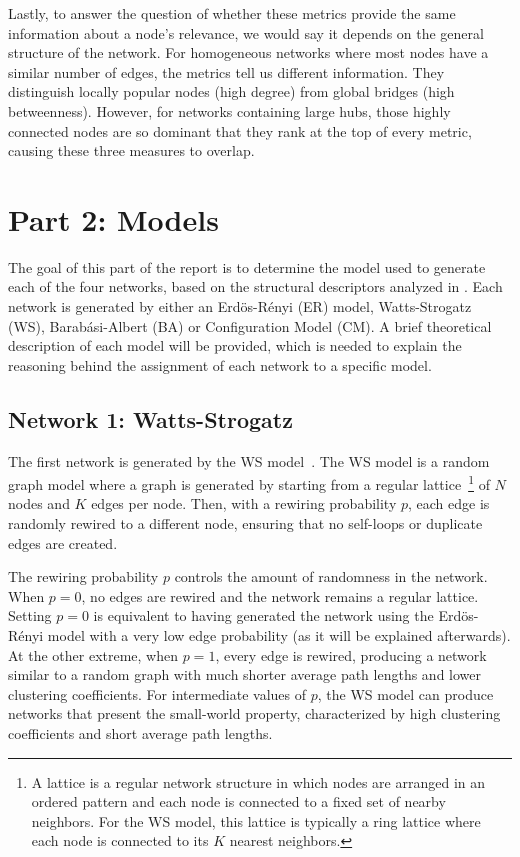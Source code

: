 \documentclass{article}
\begin{document}
Lastly, to answer the question of whether these metrics provide the same information about a node's relevance, we would say it depends on the general structure of the network. For homogeneous networks where most nodes have a similar number of edges, the metrics tell us different information. They distinguish locally popular nodes (high degree) from global bridges (high betweenness). However, for networks containing large hubs, those highly connected nodes are so dominant that they rank at the top of every metric, causing these three measures to overlap.

\section{Part 2: Models}

The goal of this part of the report is to determine the model used to generate each of the four networks, based on the structural descriptors analyzed in . Each network is generated by either an Erdös-Rényi (ER) model, Watts-Strogatz (WS), Barabási-Albert (BA) or Configuration Model (CM). A brief theoretical description of each model will be provided, which is needed to explain the reasoning behind the assignment of each network to a specific model.

\subsection{Network 1: Watts-Strogatz} %

The first network is generated by the WS model~\cite{watts1998collective}. The WS model is a random graph model where a graph is generated by starting from a regular lattice~\footnote{A lattice is a regular network structure in which nodes are arranged in an ordered pattern and each node is connected to a fixed set of nearby neighbors. For the WS model, this lattice is typically a ring lattice where each node is connected to its $K$ nearest neighbors.} of $N$ nodes and $K$ edges per node. Then, with a rewiring probability $p$, each edge is randomly rewired to a different node, ensuring that no self-loops or duplicate edges are created.

The rewiring probability $p$ controls the amount of randomness in the network. When $p=0$, no edges are rewired and the network remains a regular lattice. Setting $p=0$ is equivalent to having generated the network using the Erdös-Rényi model with a very low edge probability (as it will be explained afterwards). At the other extreme, when $p=1$, every edge is rewired, producing a network similar to a random graph with much shorter average path lengths and lower clustering coefficients. For intermediate values of $p$, the WS model can produce networks that present the small-world property, characterized by high clustering coefficients and short average path lengths.
\end{document}

